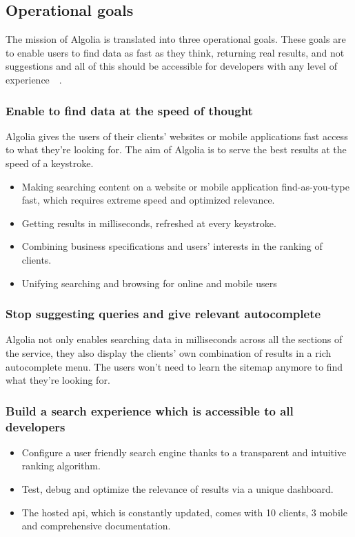 \subsection{Operational goals}

The mission of Algolia is translated into three operational goals. These goals are to enable users to find data as fast as they think, returning real results, and not suggestions and all of this should be accessible for developers with any level of experience~\cite{algolia-why}~.

\subsubsection{Enable to find data at the speed of thought}

Algolia gives the users of their clients' websites or mobile applications fast access to what they're looking for. The aim of Algolia is to serve the best results at the speed of a keystroke.

\begin{itemize}
  \item Making searching content on a website or mobile application find-as-you-type fast, which requires extreme speed and optimized relevance.
  \item Getting results in milliseconds, refreshed at every keystroke.
  \item Combining business specifications and users' interests in the ranking of clients.
  \item Unifying searching and browsing for online and mobile users
\end{itemize}

\subsubsection{Stop suggesting queries and give relevant autocomplete}

Algolia not only enables searching data in milliseconds across all the sections of the service, they also display the clients' own combination of results in a rich autocomplete menu. The users won't need to learn the sitemap anymore to find what they're looking for.

\subsubsection{Build a search experience which is accessible to all developers}

\begin{itemize}
  \item Configure a user friendly search engine thanks to a transparent and intuitive ranking algorithm.
  \item Test, debug and optimize the relevance of results via a unique dashboard.
  \item The hosted \acrshort{api}, which is constantly updated, comes with 10 clients, 3 mobile  and comprehensive documentation.
\end{itemize}

